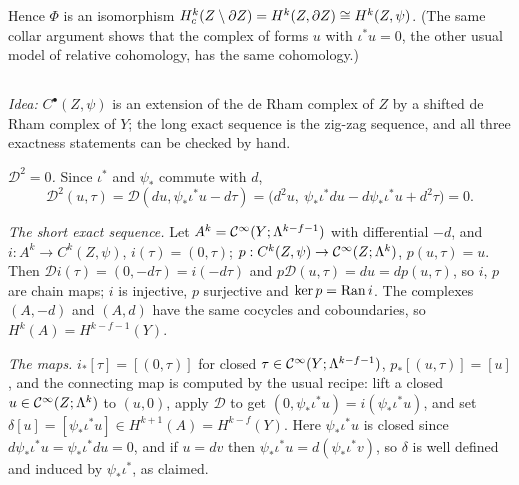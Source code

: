 Hence $\Phi$ is an isomorphism $H^k_c(Z\setminus\partial Z)=H^k(Z,\partial Z)\cong H^k(Z,\psi)$.
(The same collar argument shows that the complex of forms $u$ with $\iota^*u=0$, the
other usual model of relative cohomology, has the same cohomology.)

\subsection*{}

\emph{Idea:} $C^\bullet(Z,\psi)$ is an extension of the de Rham complex of $Z$ by a
shifted de Rham complex of $Y$; the long exact sequence is the zig-zag sequence,
and all three exactness statements can be checked by hand.

\emph{$\mathcal D^2=0$.} Since $\iota^*$ and $\psi_*$ commute with $d$,
\begin{equation*}
  \mathcal D^2(u,\tau)=\mathcal D(du,\psi_*\iota^*u-d\tau)
  =\bigl(d^2u,\ \psi_*\iota^*du-d\psi_*\iota^*u+d^2\tau\bigr)=0 .
\end{equation*}

\emph{The short exact sequence.} Let $A^k=\mathcal{C}^\infty(Y;\Lambda^{k-f-1})$ with differential
$-d$, and $i:A^k\to C^k(Z,\psi)$, $i(\tau)=(0,\tau)$; $p:C^k(Z,\psi)\to
\mathcal{C}^\infty(Z;\Lambda^k)$, $p(u,\tau)=u$. Then $\mathcal Di(\tau)=(0,-d\tau)=i(-d\tau)$ and
$p\mathcal D(u,\tau)=du=dp(u,\tau)$, so $i$, $p$ are chain maps; $i$ is injective,
$p$ surjective and $\ker p=\operatorname{Ran} i$. The complexes $(A,-d)$ and $(A,d)$ have the same
cocycles and coboundaries, so $H^k(A)=H^{k-f-1}(Y)$.

\emph{The maps.} $i_*[\tau]=[(0,\tau)]$ for closed $\tau\in\mathcal{C}^\infty(Y;\Lambda^{k-f-1})$,
$p_*[(u,\tau)]=[u]$, and the connecting map is computed by the usual recipe: lift a
closed $u\in\mathcal{C}^\infty(Z;\Lambda^k)$ to $(u,0)$, apply $\mathcal D$ to get
$(0,\psi_*\iota^*u)=i(\psi_*\iota^*u)$, and set
$\delta[u]=[\psi_*\iota^*u]\in H^{k+1}(A)=H^{k-f}(Y)$. Here $\psi_*\iota^*u$ is closed
since $d\psi_*\iota^*u=\psi_*\iota^*du=0$, and if $u=dv$ then
$\psi_*\iota^*u=d(\psi_*\iota^*v)$, so $\delta$ is well defined and induced by
$\psi_*\iota^*$, as claimed.

